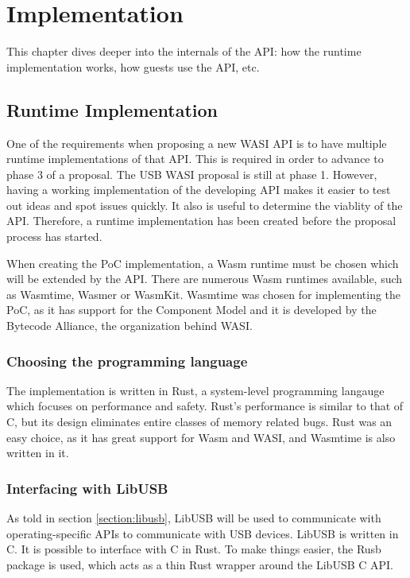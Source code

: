 \chapter{Implementation}
\label{chapter:implementation}
This chapter dives deeper into the internals of the API: how the runtime implementation works, how guests use the API, etc.

\section{Runtime Implementation}
One of the requirements when proposing a new \acrshort{WASI} \acrshort{API} is to have multiple runtime implementations of that \acrshort{API}. This is required in order to advance to phase 3 of a proposal. The \acrshort{USB} \acrshort{WASI} proposal is still at phase 1. However, having a working implementation of the developing \acrshort{API} makes it easier to test out ideas and spot issues quickly. It also is useful to determine the viablity of the \acrshort{API}. Therefore, a runtime implementation has been created before the proposal process has started.

When creating the \acrshort{PoC} implementation, a \acrshort{Wasm} runtime must be chosen which will be extended by the \acrshort{API}. There are numerous \acrshort{Wasm} runtimes available, such as Wasmtime, Wasmer or WasmKit. Wasmtime was chosen for implementing the \acrshort{PoC}, as it has support for the Component Model and it is developed by the Bytecode Alliance, the organization behind \acrshort{WASI}.

\subsection{Choosing the programming language}
The implementation is written in Rust, a system-level programming langauge which focuses on performance and safety. Rust's performance is similar to that of C, but its design eliminates entire classes of memory related bugs. Rust was an easy choice, as it has great support for \acrshort{Wasm} and \acrshort{WASI}, and Wasmtime is also written in it.

\subsection{Interfacing with LibUSB}
As told in section \ref{section:libusb}, LibUSB will be used to communicate with operating-specific APIs to communicate with USB devices. LibUSB is written in C. It is possible to interface with C in Rust. To make things easier, the Rusb package is used, which acts as a thin Rust wrapper around the LibUSB C API.

